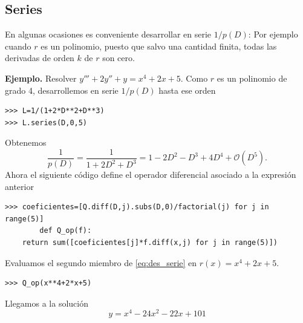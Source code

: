 \subsection{Series}
En algunas ocasiones es conveniente desarrollar en serie $1/p(D)$:
Por ejemplo cuando $r$ es un polinomio, puesto que salvo una cantidad finita, todas las derivadas de orden $k$ de $r$ son cero.

\noindent\textbf{Ejemplo.} Resolver $y'''+2y''+y=x^4+2x+5$.
Como $r$ es un polinomio de grado 4, desarrollemos en serie $1/p(D)$ hasta ese orden

\begin{lstlisting}
>>> L=1/(1+2*D**2+D**3)
>>> L.series(D,0,5)
\end{lstlisting}
Obtenemos
\[\frac{1}{p(D)}=\frac{1}{1+2D^2+D^3}=
1 - 2 D^{2} - D^{3} + 4 D^{4} + \mathcal{O}\left(D^{5}\right).\]
Ahora el siguiente código  define el operador diferencial asociado a la expresión anterior
\begin{lstlisting}
>>> coeficientes=[Q.diff(D,j).subs(D,0)/factorial(j) for j in range(5)]
        def Q_op(f):
	return sum([coeficientes[j]*f.diff(x,j) for j in range(5)])
\end{lstlisting}

Evaluamos el segundo miembro de  \eqref{eq:des_serie} en $r(x)=x^4+2x+5$.
\begin{lstlisting}
>>> Q_op(x**4+2*x+5)
\end{lstlisting}
Llegamos a la solución
\[y=x^{4} - 24 x^{2} - 22 x + 101
\]

%

